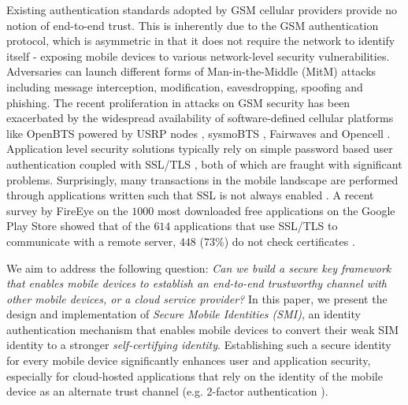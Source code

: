 \documentclass[letterpaper,twocolumn]{sig-alternate}
\begin{document}
Existing authentication standards adopted by GSM cellular providers provide no notion of end-to-end trust. This is inherently due to the GSM authentication protocol, which is asymmetric in that it does not require the network to identify itself - exposing mobile devices to various network-level security vulnerabilities. Adversaries can launch different forms of Man-in-the-Middle (MitM) attacks \cite{securityVul} including message interception, modification, eavesdropping, spoofing and phishing. The recent proliferation in attacks on GSM security \cite{praattack,germany,comp128} has been exacerbated by the widespread availability of software-defined cellular platforms like OpenBTS \cite{openbts} powered by USRP nodes \cite{usrp}, sysmoBTS \cite{sysmobts}, Fairwaves \cite{fairwaves} and Opencell \cite{opencell}.  Application level security solutions typically rely on simple password based user authentication coupled with SSL/TLS \cite{ssltls}, both of which are fraught with significant problems. Surprisingly, many transactions in the mobile landscape are performed through applications written such that SSL is not always enabled \cite{schrittwieser2012guess}. A recent survey by FireEye on the $1000$ most downloaded free applications on the Google Play Store showed that of the $614$ applications that use SSL/TLS to communicate with a remote server, $448$ ($73\%$) do not check certificates \cite{fireeye}.

We aim to address the following question: {\em Can we build a secure key framework that enables mobile devices to establish an end-to-end trustworthy channel with other mobile devices, or a cloud service provider?} In this paper, we present the design and implementation of {\em Secure Mobile Identities (SMI)}, an identity authentication mechanism that enables mobile devices to convert their weak SIM identity to a stronger {\em self-certifying identity}. Establishing such a secure identity for every mobile device significantly enhances user and application security, especially for cloud-hosted applications that rely on the identity of the mobile device as an alternate trust channel (e.g. 2-factor authentication \cite{2fauth,schneier2005two}). 
\end{document}
